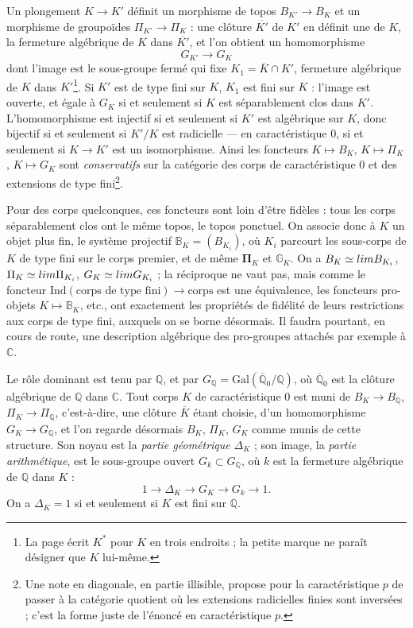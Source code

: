 \documentclass[11pt,a4paper]{article}
\begin{document}
Un plongement $K \to K'$ définit un morphisme de topos $B_{K'} \to B_K$ et
un morphisme de groupoïdes $\Pi_{K'} \to \Pi_K$ : une clôture $\overline{K'}$
de $K'$ en définit une de $K$, la fermeture algébrique de $K$ dans
$\overline{K'}$, et l'on obtient un homomorphisme
\[
G_{K'} \longrightarrow G_K
\]
dont l'image est le sous-groupe fermé qui fixe $K_1 = \overline{K} \cap K'$,
fermeture algébrique de $K$ dans $K'$\footnote{La page écrit $K^{*}$ pour
$K$ en trois endroits ; la petite marque ne paraît désigner que $K$
lui-même.}. Si $K'$ est de type fini sur $K$, $K_1$ est fini sur $K$ :
l'image est ouverte, et égale à $G_K$ si et seulement si $K$ est
séparablement clos dans $K'$. L'homomorphisme est injectif si et seulement si
$K'$ est algébrique sur $K$, donc bijectif si et seulement si $K'/K$ est
radicielle — en caractéristique $0$, si et seulement si $K \to K'$ est un
isomorphisme. Ainsi les foncteurs $K \mapsto B_K$, $K \mapsto \Pi_K$,
$K \mapsto G_K$ sont \emph{conservatifs} sur la catégorie des corps de
caractéristique $0$ et des extensions de type fini\footnote{Une note en
diagonale, en partie illisible, propose pour la caractéristique $p$ de
passer à la catégorie quotient où les extensions radicielles finies sont
inversées ; c'est la forme juste de l'énoncé en caractéristique $p$.}.

Pour des corps quelconques, ces foncteurs sont loin d'être fidèles : tous les
corps séparablement clos ont le même topos, le topos ponctuel. On associe donc
à $K$ un objet plus fin, le système projectif $\mathbb{B}_K = (B_{K_i})$, où
$K_i$ parcourt les sous-corps de $K$ de type fini sur le corps premier, et de
même $\boldsymbol{\Pi}_K$ et $\mathbb{G}_K$. On a $B_K \simeq \varprojlim
B_{K_i}$, $\Pi_K \simeq \varprojlim \Pi_{K_i}$, $G_K \simeq \varprojlim
G_{K_i}$ ; la réciproque ne vaut pas, mais comme le foncteur
$\mathrm{Ind}(\text{corps de type fini}) \to \text{corps}$ est une
équivalence, les foncteurs pro-objets $K \mapsto \mathbb{B}_K$, etc., ont
exactement les propriétés de fidélité de leurs restrictions aux corps de type
fini, auxquels on se borne désormais. Il faudra pourtant, en cours de route,
une description algébrique des pro-groupes attachés par exemple à
$\mathbb{C}$.

Le rôle dominant est tenu par $\mathbb{Q}$, et par $G_{\mathbb{Q}} =
\mathrm{Gal}(\overline{\mathbb{Q}}_0/\mathbb{Q})$, où
$\overline{\mathbb{Q}}_0$ est la clôture algébrique de $\mathbb{Q}$ dans
$\mathbb{C}$. Tout corps $K$ de caractéristique $0$ est muni de $B_K \to
B_{\mathbb{Q}}$, $\Pi_K \to \Pi_{\mathbb{Q}}$, c'est-à-dire, une clôture
$\overline{K}$ étant choisie, d'un homomorphisme $G_K \to
G_{\mathbb{Q}}$, et l'on regarde désormais $B_K$, $\Pi_K$, $G_K$ comme munis
de cette structure. Son noyau est la \emph{partie géométrique}
$\Delta_K$ ; son image, la \emph{partie arithmétique}, est le sous-groupe
ouvert $G_k \subset G_{\mathbb{Q}}$, où $k$ est la fermeture algébrique de
$\mathbb{Q}$ dans $K$ :
\[
1 \longrightarrow \Delta_K \longrightarrow G_K \longrightarrow G_k
\longrightarrow 1 .
\]
On a $\Delta_K = 1$ si et seulement si $K$ est fini sur $\mathbb{Q}$.
\end{document}
